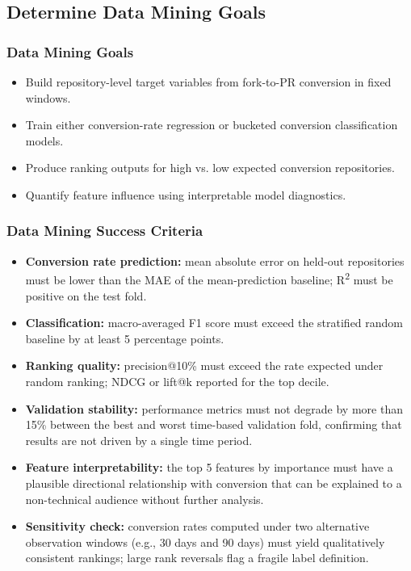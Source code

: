 \subsection{Determine Data Mining Goals}

\subsubsection{Data Mining Goals}
\begin{itemize}
  \item Build repository-level target variables from fork-to-PR conversion in fixed windows.
  \item Train either conversion-rate regression or bucketed conversion classification models.
  \item Produce ranking outputs for high vs. low expected conversion repositories.
  \item Quantify feature influence using interpretable model diagnostics.
\end{itemize}

\subsubsection{Data Mining Success Criteria}
\begin{itemize}
  \item \textbf{Conversion rate prediction:} mean absolute error on held-out repositories must be lower than the MAE of the mean-prediction baseline; R\textsuperscript{2} must be positive on the test fold.
  \item \textbf{Classification:} macro-averaged F1 score must exceed the stratified random baseline by at least 5 percentage points.
  \item \textbf{Ranking quality:} precision@10\% must exceed the rate expected under random ranking; NDCG or lift@k reported for the top decile.
  \item \textbf{Validation stability:} performance metrics must not degrade by more than 15\% between the best and worst time-based validation fold, confirming that results are not driven by a single time period.
  \item \textbf{Feature interpretability:} the top 5 features by importance must have a plausible directional relationship with conversion that can be explained to a non-technical audience without further analysis.
  \item \textbf{Sensitivity check:} conversion rates computed under two alternative observation windows (e.g., 30 days and 90 days) must yield qualitatively consistent rankings; large rank reversals flag a fragile label definition.
\end{itemize}


